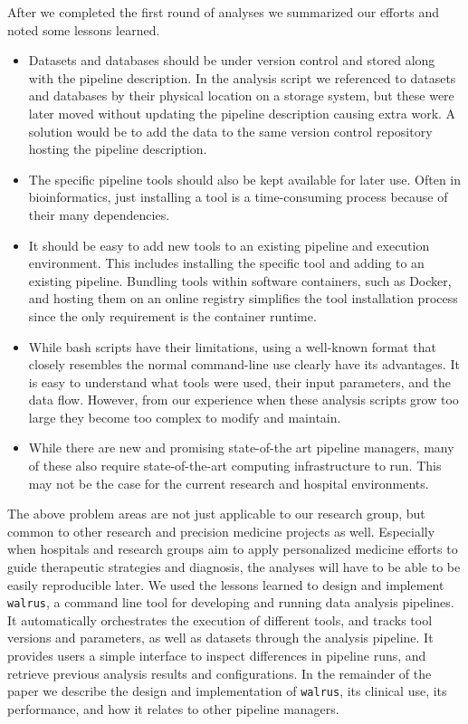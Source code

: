 After we completed the first round of analyses we summarized our efforts and
noted some lessons learned. 
\begin{itemize}
    \item  Datasets and databases should be under version control and stored
        along with the pipeline description. In the analysis script we
        referenced to datasets and databases by their physical location on a
        storage system, but these were later moved without updating the pipeline
        description causing extra work. A solution would be to add the data to
        the same version control repository hosting the pipeline description.
    \item The specific pipeline tools should also be kept available for
        later use. Often in bioinformatics, just installing a tool is a
        time-consuming process because of their many dependencies. 
    \item It should be easy to add new tools to an existing
        pipeline and execution environment. This includes installing the specific
        tool and adding to an existing pipeline. Bundling tools within software
        containers, such as Docker, and hosting them on an online registry
        simplifies the tool installation process since the only requirement is
        the container runtime.
    \item While bash scripts have their
        limitations, using a well-known format that closely resembles the normal
        command-line use clearly have its advantages. It is easy to understand
        what tools were used, their input parameters, and the data flow.
        However, from our experience when these analysis scripts grow too large
        they become too complex to modify and maintain. 
    \item While there are new and promising state-of-the art pipeline
        managers, many of these also require state-of-the-art computing
        infrastructure to run. This may not be the case for the current research
        and hospital environments. 
\end{itemize} 


The above problem areas are not just applicable to our research group, but
common to other research and precision medicine projects as well. Especially
when hospitals and research groups aim to apply personalized medicine efforts to
guide therapeutic strategies and diagnosis, the analyses will have to be able to
be easily reproducible later. We used the lessons learned to  design and
implement \texttt{walrus}, a command line tool for developing and running data
analysis pipelines. It automatically orchestrates the execution of different
tools, and tracks tool versions and parameters, as well as datasets through the
analysis pipeline. It provides users a simple interface to inspect differences
in pipeline runs, and retrieve previous analysis results and configurations. In
the remainder of the paper we describe the design and implementation of
\texttt{walrus}, its clinical use, its performance, and how it relates to other
pipeline managers. 

